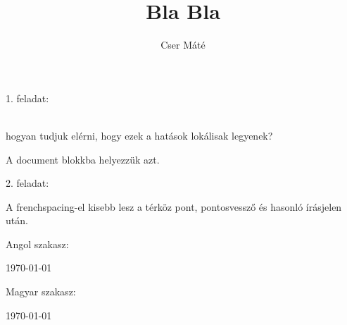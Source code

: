 \documentclass{article}
\begin{document}
\title{Bla Bla}
\author{Cser Máté}
\maketitle

\begin{large}
1. feladat:
\end{large}

\noindent
\bigskip
\blindtext[2] \newpage

\begin{flushright}
\hulipsum[2-3]
\end{flushright} \newpage

{
\begin{otherlanguage}{latin}
\linespread{2}
\lipsum[2-3]
\end{otherlanguage} } \\

hogyan tudjuk elérni, hogy ezek a hatások lokálisak legyenek? \par
A document blokkba helyezzük azt. \\


\begin{large}
2. feladat:
\end{large}
A frenchspacing-el kisebb lesz a térköz pont, pontosvessző és hasonló írásjelen után.


Angol szakasz: \par
\begin{otherlanguage}{english}
\today
\end{otherlanguage}

Magyar szakasz: \par
\begin{otherlanguage}{magyar}
\today
\end{otherlanguage}
\end{document}
